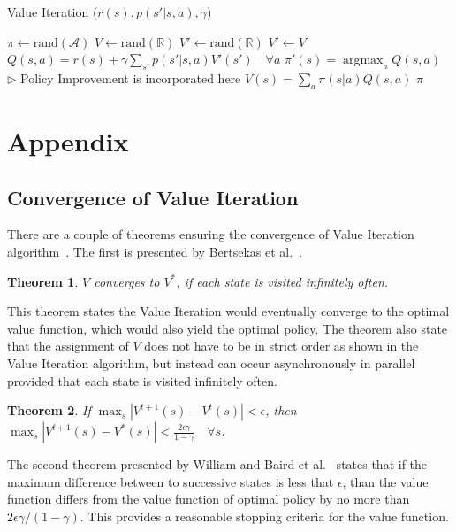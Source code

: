 \documentclass[11pt]{article}
\DeclareMathOperator*{\argmax}{argmax} %
\newtheorem{theorem}{Theorem}
\begin{document}
\begin{algorithm}[H]
\caption{Value Iteration ($r(s), p(s'|s, a), \gamma$)}
\label{algo:value_iteration}
\begin{algorithmic}[1]
\STATE $\pi \leftarrow \text{rand}(\mathcal{A})$
\STATE $V \leftarrow \text{rand}(\mathbb{R})$
\STATE $V' \leftarrow \text{rand}(\mathbb{R})$
\STATE $V' \leftarrow V$
\STATE $Q(s, a) = r(s) + \gamma \sum_{s'} p(s'|s, a) V'(s') \quad \forall a$ 
\STATE $\pi'(s) = \argmax_a Q(s, a)$ \hfill $\triangleright$ Policy Improvement is incorporated here
\STATE $V(s) = \sum_a \pi(s|a)Q(s, a)$
\ENDFOR
\ENDWHILE
\RETURN $\pi$
\end{algorithmic}
\end{algorithm}



\section{Appendix}

\subsection{Convergence of Value Iteration}

There are a couple of theorems ensuring the convergence of Value Iteration algorithm~\cite{10601lecture15, kaelbling1996reinforcement}. The first is presented by Bertsekas et al.~\cite{bertsekas1989parallel}.
%
\begin{theorem}
$V$ converges to $V^*$, if each state is visited infinitely often.
\end{theorem}
%
This theorem states the Value Iteration would eventually converge to the optimal value function, which would also yield the optimal policy. The theorem also state that the assignment of $V$ does not have to be in strict order as shown in the Value Iteration algorithm, but instead can occur asynchronously in parallel provided that each state is visited infinitely often.

\begin{theorem}
If $\max_s | V^{t+1}(s) - V^t(s) | < \epsilon$, then $\max_s | V^{t+1}(s) - V^*(s) | < \frac{2\epsilon\gamma}{1-\gamma} \quad \forall s$.
\end{theorem}

The second theorem presented by William and Baird et al.~\cite{william1993b} states that if the maximum difference between to successive states is less that $\epsilon$, than the value function differs from the value function of optimal policy by no more than $2\epsilon\gamma / (1-\gamma)$. This provides a reasonable stopping criteria for the value function.
\end{document}
